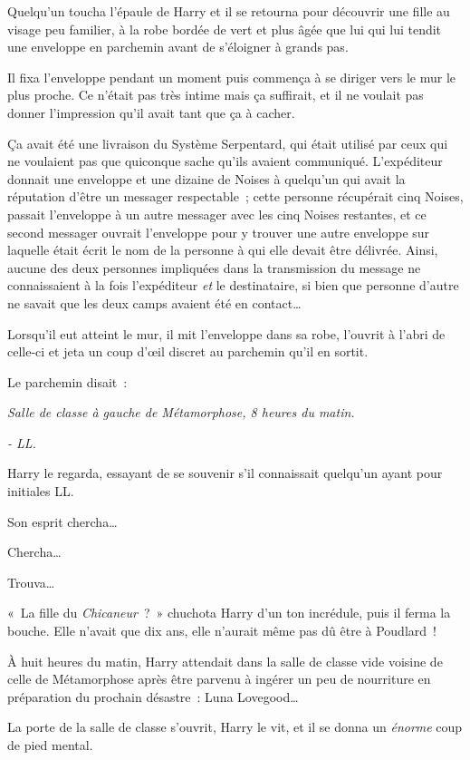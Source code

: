 Quelqu'un toucha l'épaule de Harry et il se retourna pour découvrir une fille au visage peu familier, à la robe bordée de vert et plus âgée que lui qui lui tendit une enveloppe en parchemin avant de s'éloigner à grands pas.

Il fixa l'enveloppe pendant un moment puis commença à se diriger vers le mur le plus proche. Ce n'était pas très intime mais ça suffirait, et il ne voulait pas donner l'impression qu'il avait tant que ça à cacher.

Ça avait été une livraison du Système Serpentard, qui était utilisé par ceux qui ne voulaient pas que quiconque sache qu'ils avaient communiqué. L'expéditeur donnait une enveloppe et une dizaine de Noises à quelqu'un qui avait la réputation d'être un messager respectable~; cette personne récupérait cinq Noises, passait l'enveloppe à un autre messager avec les cinq Noises restantes, et ce second messager ouvrait l'enveloppe pour y trouver une autre enveloppe sur laquelle était écrit le nom de la personne à qui elle devait être délivrée. Ainsi, aucune des deux personnes impliquées dans la transmission du message ne connaissaient à la fois l'expéditeur \emph{et} le destinataire, si bien que personne d'autre ne savait que les deux camps avaient été en contact…

Lorsqu'il eut atteint le mur, il mit l'enveloppe dans sa robe, l'ouvrit à l'abri de celle-ci et jeta un coup d'œil discret au parchemin qu'il en sortit.

Le parchemin disait~:

\emph{Salle de classe à gauche de Métamorphose, 8 heures du matin.}

\emph{- LL.}

Harry le regarda, essayant de se souvenir s'il connaissait quelqu'un ayant pour initiales LL.

Son esprit chercha…

Chercha…

Trouva…

«~La fille du \emph{Chicaneur}~?~» chuchota Harry d'un ton incrédule, puis il ferma la bouche. Elle n'avait que dix ans, elle n'aurait même pas dû être à Poudlard~!


À huit heures du matin, Harry attendait dans la salle de classe vide voisine de celle de Métamorphose après être parvenu à ingérer un peu de nourriture en préparation du prochain désastre~: Luna Lovegood…

La porte de la salle de classe s'ouvrit, Harry le vit, et il se donna un \emph{énorme} coup de pied mental.

